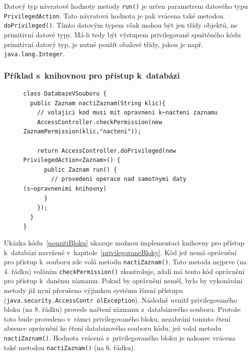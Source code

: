 Datový typ návratové hodnoty metody {\tt run()} je určen parametrem datového typu {\tt PrivilegedAction}.
Tato návratová hodnota je pak vrácena také metodou {\tt doPrivileged()}.
Tímto datovým typem však mohou být jen třídy objektů, ne primitivní datové typy.
Má-li tedy být výstupem privilegovaně spuštěného kódu primitivní datový typ, je nutné použít obalové třídy, jakou je např. {\tt java.lang.Integer}.

\subsubsection{Příklad s~knihovnou pro přístup k~databázi}\label{databazeVsouboru}

\begin{figure}[tbh]
\begin{lstlisting}[caption=Demonstrační knihovna pro přístup k~databázi, label=pouzitiBloku]
class DatabazeVSouboru {
  public Zaznam nactiZaznam(String klic){
    // volajici kod musi mit opravneni k~nacteni zaznamu
    AccessController.checkPermission(new ZaznamPermission(klic,"nacteni"));
    
    return AccessController.doPrivileged(new PrivilegedAction<Zaznam>() {
      public Zaznam run() {
        // provedeni operace nad samotnymi daty (s~opravnenimi knihovny)
      }
    });
  }
}
\end{lstlisting}
\end{figure}

Ukázka kódu~\ref{pouzitiBloku} ukazuje možnou implementaci knihovny pro přístup k~databázi navržené v~kapitole~\ref{privilegovaneBloky}.
Kód jež nemá oprávnění pro přístup k~souboru zde volá metodu {\tt nactiZaznam()}.
Tato metoda nejprve (na 4. řádku) voláním {\tt checkPermission()} zkontroluje, zdali má tento kód oprávnění pro přístup k~danému záznamu.
Pokud by oprávnění neměl, bylo by vykonávání metody již nyní přerušeno výjimkou systému řízení přístupu ({\tt java.security.AccessContr olException}).
Následně uvnitř privilegovaného bloku (na 8. řádku) provede načtení záznamu z~databázového souboru.
Protože toto bude provedeno v~rámci privilegovaného bloku, nezabrání tomuto čtení absence oprávnění ke čtení databázového souboru kódu, jež volal metodu {\tt nactiZaznam()}.
Hodnota vrácená z~privilegovaného bloku je nakonec vrácena také metodou {\tt nactiZaznam()} (na 6. řádku).


